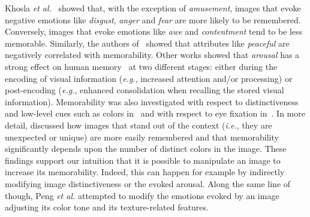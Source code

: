 \documentclass{sig-alternate-05-2015}
\begin{document}
Khosla \textit{et al.}~\cite{khosla2015understanding} showed that, with the exception of \emph{amusement}, images that evoke negative emotions like \emph{disgust}, \emph{anger} and \emph{fear} are more likely to be remembered. Conversely, images that evoke emotions like \emph{awe} and \emph{contentment} tend to be less memorable. Similarly, the authors of~\cite{isola2011understanding} showed that attributes like \emph{peaceful} are negatively correlated with memorability. Other works showed that \emph{arousal} has a strong effect on human memory~\cite{anderson2006emotion,cahill1995novel,bradley1992remembering,mcgaugh2006make} at two different stages: either during the encoding of visual information (\textit{e.g.}, increased attention and/or processing) or post-encoding (\textit{e.g.}, enhanced consolidation when recalling the stored visual information). Memorability was also investigated with respect to distinctiveness and low-level cues such as colors in~\cite{borkin2013makes} and with respect to eye fixation in~\cite{khosla2015understanding,bylinskii2015intrinsic}. In more detail, \cite{borkin2013makes} discussed how images that stand out of the context (\textit{i.e.}, they are unexpected or unique) are more easily remembered and that memorability significantly depends upon the number of distinct colors in the image. %
These findings support our intuition that it is possible to {manipulate an image to increase its memorability}.
Indeed, this can happen for example by indirectly modifying image distinctiveness or the evoked arousal. Along the same line of though, Peng \textit{et al.} \cite{peng2015mixed} attempted to modify the emotions evoked by an image adjusting its color tone and its texture-related features.
\end{document}
